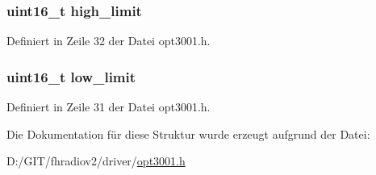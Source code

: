 \subsubsection[{high\+\_\+limit}]{\setlength{\rightskip}{0pt plus 5cm}uint16\+\_\+t high\+\_\+limit}\label{structopt3001__stc_af121d4246e275920873b33ad155fa9ba}


Definiert in Zeile 32 der Datei opt3001.\+h.

\hypertarget{structopt3001__stc_a5561e4eedc9af4ceb86ed5056241bf77}{}
\subsubsection[{low\+\_\+limit}]{\setlength{\rightskip}{0pt plus 5cm}uint16\+\_\+t low\+\_\+limit}\label{structopt3001__stc_a5561e4eedc9af4ceb86ed5056241bf77}


Definiert in Zeile 31 der Datei opt3001.\+h.



Die Dokumentation für diese Struktur wurde erzeugt aufgrund der Datei\+:\begin{DoxyCompactItemize}
\item 
D\+:/\+G\+I\+T/fhradiov2/driver/\hyperlink{opt3001_8h}{opt3001.\+h}\end{DoxyCompactItemize}
